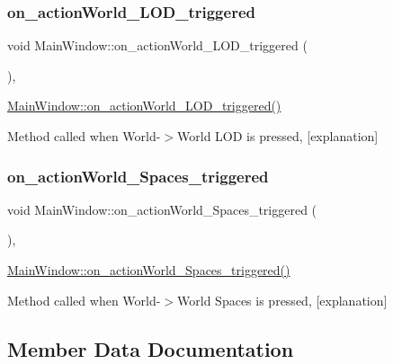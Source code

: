 \subsubsection{\texorpdfstring{on\+\_\+action\+World\+\_\+\+L\+O\+D\+\_\+triggered}{on\_actionWorld\_LOD\_triggered}}
{\footnotesize\ttfamily void Main\+Window\+::on\+\_\+action\+World\+\_\+\+L\+O\+D\+\_\+triggered (\begin{DoxyParamCaption}{ }\end{DoxyParamCaption})\hspace{0.3cm}{\ttfamily [private]}, {\ttfamily [slot]}}



\hyperlink{class_main_window_ac8f6bda78b3a005a294a7a1304acd1ec}{Main\+Window\+::on\+\_\+action\+World\+\_\+\+L\+O\+D\+\_\+triggered()} 

Method called when World-\/$>$World L\+OD is pressed, \mbox{[}explanation\mbox{]} \mbox{\label{class_main_window_a8e0b3c4ebbe0e6a744500f32e7b343f9}} 
\subsubsection{\texorpdfstring{on\+\_\+action\+World\+\_\+\+Spaces\+\_\+triggered}{on\_actionWorld\_Spaces\_triggered}}
{\footnotesize\ttfamily void Main\+Window\+::on\+\_\+action\+World\+\_\+\+Spaces\+\_\+triggered (\begin{DoxyParamCaption}{ }\end{DoxyParamCaption})\hspace{0.3cm}{\ttfamily [private]}, {\ttfamily [slot]}}



\hyperlink{class_main_window_a8e0b3c4ebbe0e6a744500f32e7b343f9}{Main\+Window\+::on\+\_\+action\+World\+\_\+\+Spaces\+\_\+triggered()} 

Method called when World-\/$>$World Spaces is pressed, \mbox{[}explanation\mbox{]} 

\subsection{Member Data Documentation}
\mbox{\label{class_main_window_a35466a70ed47252a0191168126a352a5}} 
